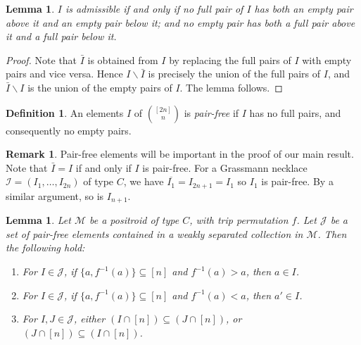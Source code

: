 \documentclass[10pt]{amsart}
\newtheorem{lemm}[theo]{Lemma}
\theoremstyle{definition}
\newtheorem{defi}[theo]{Definition}
\newtheorem{rema}[theo]{Remark}
\begin{document}
\begin{lemm}
$I$ is admissible if and only if no full pair of $I$ has both an empty pair above it and an empty pair below it; and no empty pair has both a full pair above it and a full pair below it. 
\end{lemm}

\begin{proof}
Note that $\bar{I}$ is obtained from $I$ by replacing the full pairs of $I$ with empty pairs and vice versa. Hence $I \backslash \bar{I}$ is precisely the union of the full pairs of $I$, and $\bar{I} \backslash I$ is the union of the empty pairs of $I$. The lemma follows. \end{proof}

\begin{defi}An elements $I$ of $\binom{[2n]}{n}$ is \emph{pair-free} if $I$ has no full pairs, and consequently no empty pairs. 
\end{defi}

\begin{rema}
\label{I1_is_pair_free}
Pair-free elements will be important in the proof of our main result. Note that $\bar{I} = I$ if and only if $I$ is pair-free. For a Grassmann necklace $\mathcal{I}=(I_1,\ldots,I_{2n})$ of type $C$, we have $\overline{I_1} = I_{2n + 1} = I_1$
so $I_1$ is pair-free. 
By a similar argument, so is $I_{n + 1}.$
\end{rema}

\begin{lemm}\label{pairless}Let $\mathcal{M}$ be a positroid of type $C$, with trip permutation $f$. Let $\mathcal{J}$ be a set of pair-free elements contained in a weakly separated collection in $\mathcal{M}$. Then the following hold:
\begin{enumerate}
\item\label{lemm4.6_1} For $I \in \mathcal{J}$, if $\{a, f^{-1}(a)\} \subseteq [n]$ and $f^{-1}(a) > a$, then $a \in I$.
\item\label{lemm4.6_2} For $I \in \mathcal{J}$, if $\{a,f^{-1}(a)\} \subseteq [n]$ and $f^{-1}(a) < a$, then $a' \in I$.
\item\label{lemm4.6_3} For $I, J \in \mathcal{J}$, either $(I \cap [n]) \subseteq (J \cap [n])$, or $(J \cap [n]) \subseteq (I \cap [n])$.
\end{enumerate}
\end{lemm}
\end{document}
